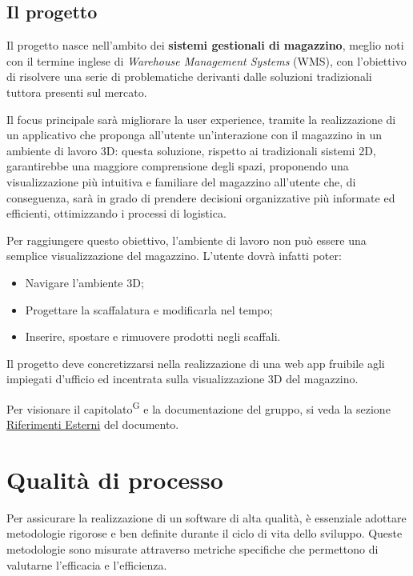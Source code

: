 \subsection{Il progetto}\label{sec:il_progetto}
\par Il progetto nasce nell'ambito dei \textbf{sistemi gestionali di magazzino}, meglio noti con il termine inglese di \textit{Warehouse Management Systems} (WMS), con l'obiettivo di risolvere una serie di problematiche derivanti dalle soluzioni tradizionali tuttora presenti sul mercato.
\par Il focus principale sarà migliorare la user experience, tramite la realizzazione di un applicativo che proponga all'utente un'interazione con il magazzino in un ambiente di lavoro 3D: questa soluzione, rispetto ai tradizionali sistemi 2D, garantirebbe una maggiore comprensione degli spazi, proponendo una visualizzazione più intuitiva e familiare del magazzino all'utente che, di conseguenza, sarà in grado di prendere decisioni organizzative più informate ed efficienti, ottimizzando i processi di logistica.
\par Per raggiungere questo obiettivo, l'ambiente di lavoro non può essere una semplice visualizzazione del magazzino. L'utente dovrà infatti poter:
\begin{itemize}
    \item Navigare l'ambiente 3D;
    \item Progettare la scaffalatura e modificarla nel tempo;
    \item Inserire, spostare e rimuovere prodotti negli scaffali.
\end{itemize}
Il progetto deve concretizzarsi nella realizzazione di una web app fruibile agli impiegati d'ufficio ed incentrata sulla visualizzazione 3D del magazzino.
\par Per visionare il capitolato\textsuperscript{G} e la documentazione del gruppo, si veda la sezione \hyperref[sec:riferimenti_esterni]{Riferimenti Esterni} del documento.

\newpage

\section{Qualità di processo}
Per assicurare la realizzazione di un software di alta qualità, è essenziale adottare metodologie rigorose e ben definite durante il ciclo di vita dello sviluppo. Queste metodologie sono misurate attraverso metriche specifiche che permettono di valutarne l'efficacia e l'efficienza.

